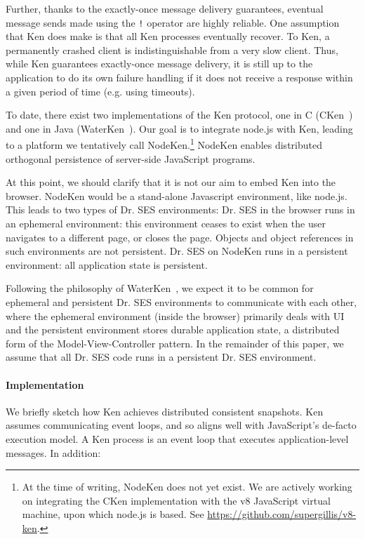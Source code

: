 \documentclass{llncs}
\begin{document}
Further, thanks to the exactly-once message delivery guarantees, eventual message sends made using the {\tt !} operator are highly reliable. One assumption that Ken does make is that all Ken processes eventually recover. To Ken, a permanently crashed client is indistinguishable from a very slow client. Thus, while Ken guarantees exactly-once message delivery, it is still up to the application to do its own failure handling if it does not receive a response within a given period of time (e.g. using timeouts).

To date, there exist two implementations of the Ken protocol, one in C (CKen~\cite{Yoo:CKen}) and one in Java (WaterKen~\cite{Close:Waterken}). Our goal is to integrate node.js with Ken, leading to a platform we tentatively call NodeKen.\footnote{
%
At the time of writing, NodeKen does not yet exist. We are actively working on integrating the CKen implementation with the v8 JavaScript virtual machine, upon which node.js is based. See \url{https://github.com/supergillis/v8-ken}.
%
} NodeKen enables distributed orthogonal persistence of server-side JavaScript programs.

At this point, we should clarify that it is not our aim to embed Ken into the browser. NodeKen would be a stand-alone Javascript environment, like node.js. This leads to two types of Dr. SES environments: Dr. SES in the browser runs in an ephemeral environment: this environment ceases to exist when the user navigates to a different page, or closes the page. Objects and object references in such environments are not persistent. Dr. SES on NodeKen runs in a persistent environment: all application state is persistent.

Following the philosophy of WaterKen~\cite{Close:Waterken}, we expect it to be common for ephemeral and persistent Dr. SES environments to communicate with each other, where the ephemeral environment (inside the browser) primarily deals with UI and the persistent environment stores durable application state, a distributed form of the Model-View-Controller pattern. In the remainder of this paper, we assume that all Dr. SES code runs in a persistent Dr. SES environment.

\paragraph{Implementation} 

We briefly sketch how Ken achieves distributed consistent snapshots. Ken assumes communicating event loops, and so aligns well with JavaScript's de-facto execution model. A Ken process is an event loop that executes application-level messages. In addition:
\end{document}
